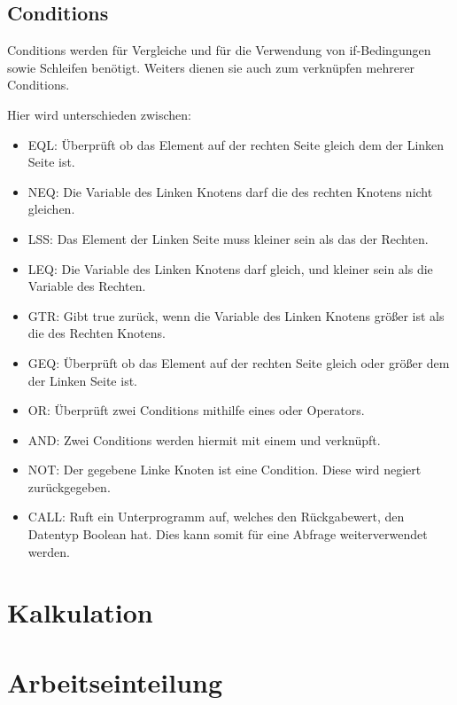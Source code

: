 \subsection{Conditions}
Conditions werden für Vergleiche und für die Verwendung von if-Bedingungen sowie Schleifen benötigt. Weiters dienen sie auch zum verknüpfen mehrerer Conditions.

Hier wird unterschieden zwischen:
\begin{itemize}
\item EQL: Überprüft ob das Element auf der rechten Seite gleich dem der Linken Seite ist.
\item NEQ: Die Variable des Linken Knotens darf die des rechten Knotens nicht gleichen.
\item LSS: Das Element der Linken Seite muss kleiner sein als das der Rechten.
\item LEQ: Die Variable des Linken Knotens darf gleich, und kleiner sein als die Variable des Rechten.
\item GTR: Gibt true zurück, wenn die Variable des Linken Knotens größer ist als die des Rechten Knotens.
\item GEQ: Überprüft ob das Element auf der rechten Seite gleich oder größer dem der Linken Seite ist.
\item OR: Überprüft zwei Conditions mithilfe eines oder Operators.
\item AND: Zwei Conditions werden hiermit mit einem und verknüpft.
\item NOT: Der gegebene Linke Knoten ist eine Condition. Diese wird negiert zurückgegeben.
\item CALL: Ruft ein Unterprogramm auf, welches den Rückgabewert, den Datentyp Boolean hat. Dies kann somit für eine Abfrage weiterverwendet werden.
\end{itemize}
\section{Kalkulation}


\section{Arbeitseinteilung}